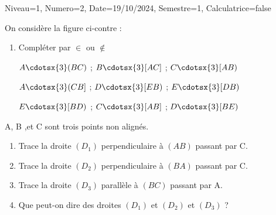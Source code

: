 \documentclass[a4paper,12pt]{article}
\begin{document}
\begin{Maquette}[DS]{Niveau=1, Numero=2, Date=19/10/2024, Semestre=1, Calculatrice=false}

\begin{exercice}
\begin{minipage}{.5\linewidth}
On considère la figure ci-contre :
\begin{enumerate}
\item{} Compléter par $\in$ ou $\notin$

$A\cdotsx{3} (BC)$ ; $B\cdotsx{3} [AC]$ ; $C\cdotsx{3} [AB)$

$A\cdotsx{3} (CB]$ ; $D\cdotsx{3} [EB)$ ; $E\cdotsx{3} [DB)$

$E\cdotsx{3} [BD)$ ; $C\cdotsx{3} [AB]$ ; $D\cdotsx{3} [BE)$
\end{enumerate}
\end{minipage}%
\begin{minipage}{.5\linewidth}
\end{minipage}
\end{exercice}

\begin{exercice}
\begin{minipage}{.66\linewidth}
A, B ,et C sont trois points non alignés. 
\begin{enumerate}
\item{} Trace la droite $(D_{1})$ perpendiculaire à $(AB)$ passant par C.
\item{} Trace la droite $(D_{2})$ perpendiculaire à $(BA)$ passant par C.
\item{} Trace la droite $(D_{3})$ parallèle à $(BC)$ passant par A.
\item{} Que peut-on dire des droites $(D_{1})$ et $(D_{2})$ et $(D_{3})$ ? 
\end{enumerate}
\end{minipage}
\begin{minipage}{.33\linewidth}
\end{minipage}%


\end{exercice}
\end{Maquette}
\end{document}
